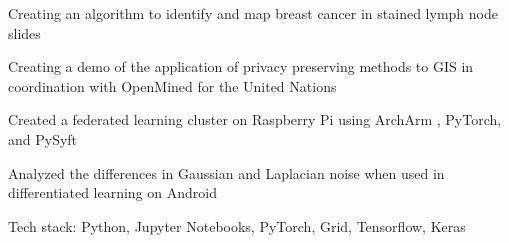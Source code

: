 \documentclass[letterpaper]{resume}
\begin{document}

\begin{compactitem}
\item Creating an algorithm to identify and map breast cancer in stained lymph node slides
\item Creating a demo of the application of privacy preserving methods to GIS in coordination with OpenMined for the United Nations
\item Created a federated learning cluster on Raspberry Pi using ArchArm , PyTorch, and PySyft
\item Analyzed the differences in Gaussian and Laplacian noise when used in differentiated learning on Android%
\item Tech stack: Python, Jupyter Notebooks, PyTorch, Grid, Tensorflow, Keras
\end{compactitem}
\end{document}
